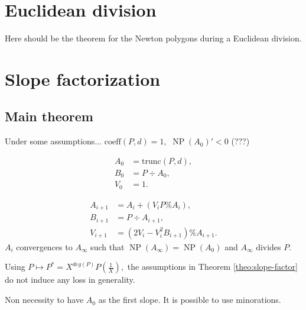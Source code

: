 \documentclass{sig-alternate-2013}
\DeclareMathOperator{\NP}{NP}
\begin{document}
\section{Euclidean division}

\begin{theo} \label{theo:EDivisionNP}
Here should be the theorem for the Newton polygons during a Euclidean division.
\end{theo}

\section{Slope factorization}
\subsection{Main theorem}

\begin{theo} \label{theo:slope-factor}
Under some assumptions... $\textrm{coeff}(P,d)=1,$ $\NP (A_0)' <0$ (???)

\begin{align*}
A_0 &= \textrm{trunc}(P,d), \\
B_{0} &= P \div A_{0}, \\
V_{0} &= 1.
\end{align*}


\begin{align*}
A_{i+1} &= A_i + (V_i P \% A_i), \\
B_{i+1} &= P \div A_{i+1}, \\
V_{i+1} &= (2 V_i -V_i^2 B_{i+1} ) \% A_{i+1}.
\end{align*}
$A_i$ convergences to $A_\infty$ such that $\NP (A_\infty)= \NP (A_0)$ and $A_\infty$ divides $P.$
\end{theo}

\begin{rem}
Using $P \mapsto P^*=X^{deg(P)}P \left( \frac{1}{X} \right), $ the assumptions in Theorem \ref{theo:slope-factor} do not induce any loss in generality.
\end{rem}

\begin{rem}
Non necessity to have $A_0$ as the first slope. It is possible to use minorations.

\end{rem}
\end{document}
